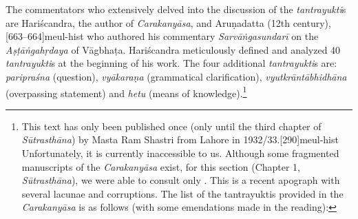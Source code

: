 The commentators who extensively delved into the discussion of the 
\emph{tantrayukti}s are Hariścandra, the author of \emph{Carakanyāsa}, and 
Aruṇadatta (12th century),[663--664]{meul-hist}
who authored his commentary \emph{Sarvāṅgasundarī} on the 
\emph{Aṣṭāṅgahṛdaya} of Vāgbhaṭa. Hariścandra meticulously defined and 
analyzed 40 \emph{tantrayukti}s at the beginning of his work. The four 
additional 
\emph{tantrayukti}s are:  \emph{paripraśna} (question), \emph{vyākaraṇa} 
(grammatical clarification), \emph{vyutkrāntābhidhāna} (overpassing 
statement) 
and \emph{hetu} (means of knowledge).\footnote{This text has only been 
published once 
	(only until the third chapter of \emph{Sūtrasthāna}) by Masta Ram Shastri 
from Lahore in 1932/33.[290]{meul-hist} Unfortunately, it is 
currently 
inaccessible to us. Although some fragmented manuscripts of the 
\emph{Carakanyāsa} exist, for this section (Chapter 1, \emph{Sūtrasthāna}), we 
were able to consult only . This is a recent 
apograph with several lacunae and corruptions. The list of the tantrayuktis 
provided in the \emph{Carakanyāsa} is as follows (with some emendations made 
in the reading): }

